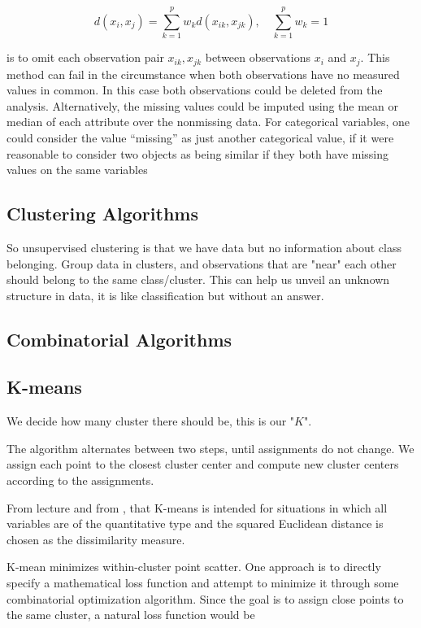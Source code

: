 \[
    d(x_i, x_j) = \sum_{k=1}^{p} w_k d(x_{ik}, x_{jk}), \quad \sum_{k=1}^{p} w_k =1
\]

is to omit each observation pair $x_{ik}, x_{jk}$ between observations $x_i$ and $x_j$. This method can fail in the circumstance
when both observations have no measured values in common. In this case
both observations could be deleted from the analysis. Alternatively, the
missing values could be imputed using the mean or median of each attribute
over the nonmissing data. For categorical variables, one could consider the
value “missing” as just another categorical value, if it were reasonable to
consider two objects as being similar if they both have missing values on
the same variables

\subsection{Clustering Algorithms}

So unsupervised clustering is that we have data but no information about class belonging. Group data in clusters, and observations that are "near" each other should belong to the same class/cluster. This can help us unveil an unknown structure in data, it is like classification but without an answer.

\subsection{Combinatorial Algorithms}

\subsection{K-means}

We decide how many cluster there should be, this is our "$K$".

The algorithm alternates between two steps, until assignments do not change. We assign each point to the closest cluster center and compute new cluster centers according to the assignments.

From lecture \cite[p.~20]{lecture7} and from \cite[509]{friedman2016elements}, that K-means is intended for situations in which all variables are of the quantitative type and the squared Euclidean distance is chosen as the dissimilarity measure.

K-mean minimizes within-cluster point scatter. One approach is to directly specify a mathematical loss function and
attempt to minimize it through some combinatorial optimization algorithm.
Since the goal is to assign close points to the same cluster, a natural loss function would be

